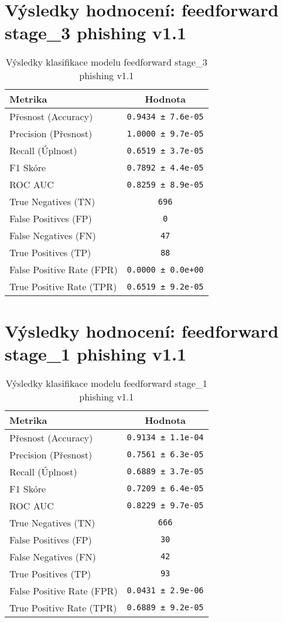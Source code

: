 \section*{Výsledky hodnocení: feedforward stage_3 phishing v1.1}
\begin{table}[h!]
\centering
\begin{tabular}{|l|c|}
\hline
\textbf{Metrika} & \textbf{Hodnota} \\
\hline
Přesnost (Accuracy) & \texttt{0.9434 ± 7.6e-05} \\
Precision (Přesnost) & \texttt{1.0000 ± 9.7e-05} \\
Recall (Úplnost) & \texttt{0.6519 ± 3.7e-05} \\
F1 Skóre & \texttt{0.7892 ± 4.4e-05} \\
ROC AUC & \texttt{0.8259 ± 8.9e-05} \\
True Negatives (TN) & \texttt{696} \\
False Positives (FP) & \texttt{0} \\
False Negatives (FN) & \texttt{47} \\
True Positives (TP) & \texttt{88} \\
False Positive Rate (FPR) & \texttt{0.0000 ± 0.0e+00} \\
True Positive Rate (TPR) & \texttt{0.6519 ± 9.2e-05} \\
\hline
\end{tabular}
\caption{Výsledky klasifikace modelu feedforward stage_3 phishing v1.1}
\label{tab:phishing_feedforward}
\end{table}

\section*{Výsledky hodnocení: feedforward stage_1 phishing v1.1}
\begin{table}[h!]
\centering
\begin{tabular}{|l|c|}
\hline
\textbf{Metrika} & \textbf{Hodnota} \\
\hline
Přesnost (Accuracy) & \texttt{0.9134 ± 1.1e-04} \\
Precision (Přesnost) & \texttt{0.7561 ± 6.3e-05} \\
Recall (Úplnost) & \texttt{0.6889 ± 3.7e-05} \\
F1 Skóre & \texttt{0.7209 ± 6.4e-05} \\
ROC AUC & \texttt{0.8229 ± 9.7e-05} \\
True Negatives (TN) & \texttt{666} \\
False Positives (FP) & \texttt{30} \\
False Negatives (FN) & \texttt{42} \\
True Positives (TP) & \texttt{93} \\
False Positive Rate (FPR) & \texttt{0.0431 ± 2.9e-06} \\
True Positive Rate (TPR) & \texttt{0.6889 ± 9.2e-05} \\
\hline
\end{tabular}
\caption{Výsledky klasifikace modelu feedforward stage_1 phishing v1.1}
\label{tab:phishing_feedforward}
\end{table}

